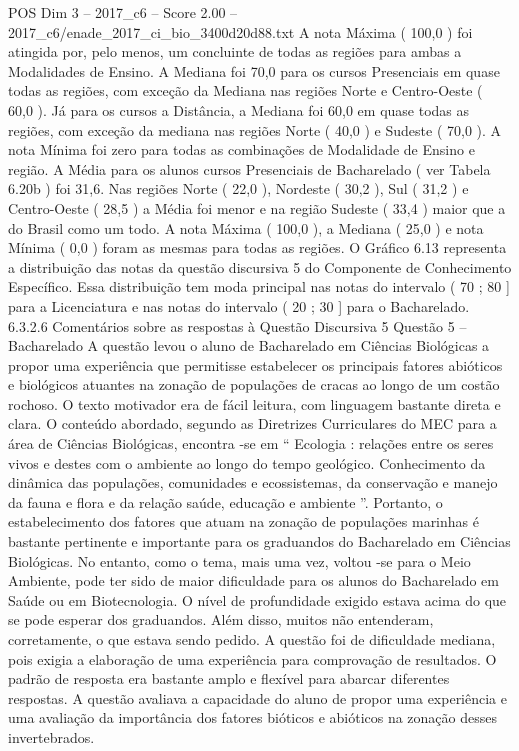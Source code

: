 \begin{textsample}{POS Dim 3 – 2017\_c6 – Score 2.00 – 2017\_c6/enade\_2017\_ci\_bio\_3400d20d88.txt}
A nota Máxima ( 100,0 ) foi atingida por, pelo menos, um concluinte de todas as regiões para ambas a Modalidades de Ensino.
A Mediana foi 70,0 para os cursos Presenciais em quase todas as regiões, com exceção da Mediana nas regiões Norte e Centro-Oeste ( 60,0 ).
Já para os cursos a Distância, a Mediana foi 60,0 em quase todas as regiões, com exceção da mediana nas regiões Norte ( 40,0 ) e Sudeste ( 70,0 ).
A nota Mínima foi zero para todas as combinações de Modalidade de Ensino e região.
A Média para os alunos cursos Presenciais de Bacharelado ( ver Tabela 6.20b ) foi 31,6.
Nas regiões Norte ( 22,0 ), Nordeste ( 30,2 ), Sul ( 31,2 ) e Centro-Oeste ( 28,5 ) a Média foi menor e na região Sudeste ( 33,4 ) maior que a do Brasil como um todo.
A nota Máxima ( 100,0 ), a Mediana ( 25,0 ) e nota Mínima ( 0,0 ) foram as mesmas para todas as regiões.
O Gráfico 6.13 representa a distribuição das notas da questão discursiva 5 do Componente de Conhecimento Específico.
Essa distribuição tem moda principal nas notas do intervalo ( 70 ; 80 ] para a Licenciatura e nas notas do intervalo ( 20 ; 30 ] para o Bacharelado. 6.3.2.6 Comentários sobre as respostas à Questão Discursiva 5 Questão 5 – Bacharelado A questão levou o aluno de Bacharelado em Ciências Biológicas a propor uma experiência que permitisse estabelecer os principais fatores abióticos e biológicos atuantes na zonação de populações de cracas ao longo de um costão rochoso.
O texto motivador era de fácil leitura, com linguagem bastante direta e clara.
O conteúdo abordado, segundo as Diretrizes Curriculares do MEC para a área de Ciências Biológicas, encontra -se em “ Ecologia : relações entre os seres vivos e destes com o ambiente ao longo do tempo geológico.
Conhecimento da dinâmica das populações, comunidades e ecossistemas, da conservação e manejo da fauna e flora e da relação saúde, educação e ambiente ”.
Portanto, o estabelecimento dos fatores que atuam na zonação de populações marinhas é bastante pertinente e importante para os graduandos do Bacharelado em Ciências Biológicas.
No entanto, como o tema, mais uma vez, voltou -se para o Meio Ambiente, pode ter sido de maior dificuldade para os alunos do Bacharelado em Saúde ou em Biotecnologia.
O nível de profundidade exigido estava acima do que se pode esperar dos graduandos.
Além disso, muitos não entenderam, corretamente, o que estava sendo pedido.
A questão foi de dificuldade mediana, pois exigia a elaboração de uma experiência para comprovação de resultados.
O padrão de resposta era bastante amplo e flexível para abarcar diferentes respostas.
A questão avaliava a capacidade do aluno de propor uma experiência e uma avaliação da importância dos fatores bióticos e abióticos na zonação desses invertebrados.

\end{textsample}
